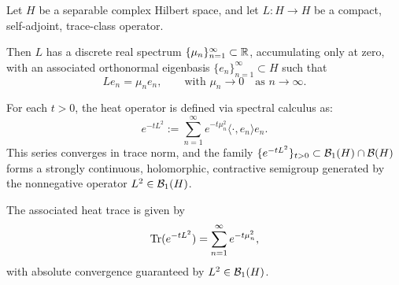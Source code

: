 \begin{definition}
\label{def:heat_operator}

Let \( H \) be a separable complex Hilbert space, and let \( L \colon H \to H \) be a compact, self-adjoint, trace-class operator.

Then \( L \) has a discrete real spectrum \( \{ \mu_n \}_{n=1}^\infty \subset \mathbb{R} \), accumulating only at zero, with an associated orthonormal eigenbasis \( \{ e_n \}_{n=1}^\infty \subset H \) such that
\[
L e_n = \mu_n e_n, \qquad \text{with } \mu_n \to 0 \quad \text{as } n \to \infty.
\]

For each \( t > 0 \), the heat operator is defined via spectral calculus as:
\[
e^{-tL^2} := \sum_{n=1}^\infty e^{-t \mu_n^2} \langle \cdot, e_n \rangle e_n.
\]
This series converges in trace norm, and the family \( \{ e^{-tL^2} \}_{t > 0} \subset \mathcal{B}_1(H) \cap \mathcal{B}(H) \) forms a strongly continuous, holomorphic, contractive semigroup generated by the nonnegative operator \( L^2 \in \mathcal{B}_1(H) \).

\medskip

The associated heat trace is given by
\[
\operatorname{Tr}(e^{-tL^2}) = \sum_{n=1}^\infty e^{-t \mu_n^2},
\]
with absolute convergence guaranteed by \( L^2 \in \mathcal{B}_1(H) \).
\end{definition}
